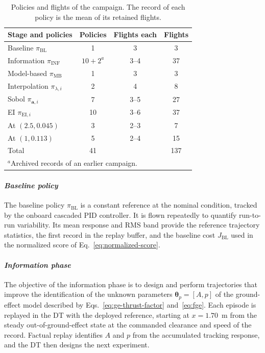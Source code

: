 \documentclass[journal]{IEEEtran}
\begin{document}
\begin{table}[t]
\centering
\caption{Policies and flights of the campaign. The record of each policy is the mean of its retained flights.}
\label{tab:campaign}
\begin{tabular}{lccc}
\hline
Stage and policies & Policies & Flights each & Flights \\
\hline
Baseline $\pi_{\mathrm{BL}}$ & 1 & 3 & 3 \\
Information $\pi_{\mathrm{INF}}$ & $10+2^{a}$ & 3--4 & 37 \\
Model-based $\pi_{\mathrm{MB}}$ & 1 & 3 & 3 \\
Interpolation $\pi_{\lambda,i}$ & 2 & 4 & 8 \\
Sobol $\pi_{\mathbf a,i}$ & 7 & 3--5 & 27 \\
EI $\pi_{\mathrm{EI},i}$ & 10 & 3--6 & 37 \\
At $(2.5,0.045)$ & 3 & 2--3 & 7 \\
At $(1,0.113)$ & 5 & 2--4 & 15 \\
\hline
Total & 41 & & 137 \\
\hline
\multicolumn{4}{l}{\footnotesize $^{a}$Archived records of an earlier campaign.}
\end{tabular}
\end{table}

\paragraph*{\textit{Baseline policy}}
The baseline policy $\pi_{\mathrm{BL}}$ is a constant reference at the nominal condition, tracked by the onboard cascaded PID controller. It is flown repeatedly to quantify run-to-run variability. Its mean response and RMS band provide the reference trajectory statistics, the first record in the replay buffer, and the baseline cost $J_{\mathrm{BL}}$ used in the normalized score of Eq.~\eqref{eq:normalized-score}.

\paragraph*{\textit{Information phase}}
\label{sec:information-phase}
The objective of the information phase is to design and perform trajectories that improve the identification of the unknown parameters $\boldsymbol{\theta}_p=[A,p]$ of the ground-effect model described by Eqs.~\eqref{eq:ge-thrust-factor} and~\eqref{eq:fge}.
Each episode is replayed in the DT with the deployed reference, starting at $x=1.70$~m from the steady out-of-ground-effect state at the commanded clearance and speed of the record. Factual replay identifies $A$ and $p$ from the accumulated tracking response, and the DT then designs the next experiment.
\end{document}
